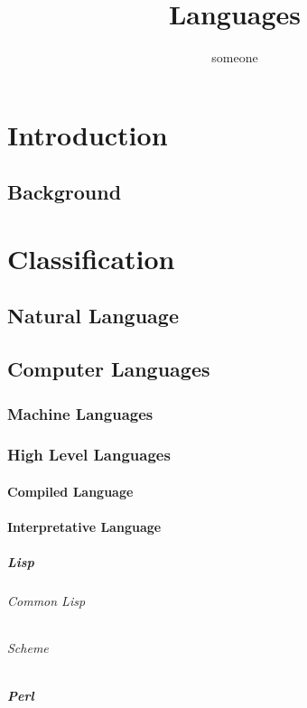 \documentclass{book}
\title{Languages}\author{someone}
\begin{document}
\maketitle
\tableofcontents
\part{Introduction}                         %
  \chapter{Background}                      %
\part{Classification}                       %
  \chapter{Natural Language}                %
  \chapter{Computer Languages}              %
    \section{Machine Languages}             %
    \section{High Level Languages}          %
      \subsection{Compiled Language}        %
      \subsection{Interpretative Language}  %
      \subsubsection{Lisp}
        \paragraph{Common Lisp}
        \paragraph{Scheme}
      \subsubsection{Perl}
\end{document}
